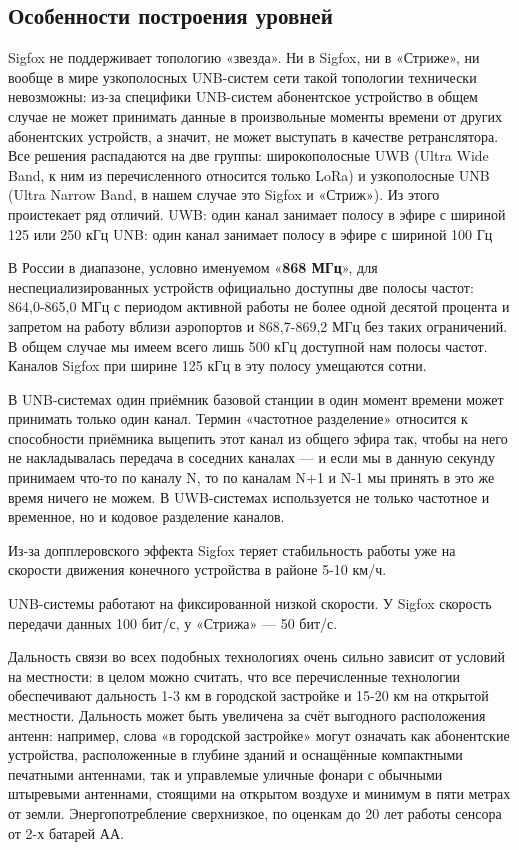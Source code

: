 \subsection{Особенности построения уровней}
Sigfox не поддерживает топологию «звезда». Ни в Sigfox, ни в «Стриже», ни вообще в мире узкополосных UNB-систем сети такой топологии технически невозможны: из-за специфики UNB-систем абонентское устройство в общем случае не может принимать данные в произвольные моменты времени от других абонентских устройств, а значит, не может выступать в качестве ретранслятора.
Все решения распадаются на две группы: широкополосные UWB (Ultra Wide Band, к ним из перечисленного относится только LoRa) и узкополосные UNB (Ultra Narrow Band, в нашем случае это Sigfox и «Стриж»). Из этого проистекает ряд отличий.
UWB: один канал занимает полосу в эфире с шириной 125 или 250 кГц
UNB: один канал занимает полосу в эфире с шириной 100 Гц

В России в диапазоне, условно именуемом «\textbf{868 МГц}», для
неспециализированных устройств официально доступны две полосы частот:
864,0-865,0 МГц с периодом активной работы не более одной десятой процента и
запретом на работу вблизи аэропортов и 868,7-869,2 МГц без таких ограничений. В общем случае мы имеем всего лишь 500 кГц доступной нам полосы частот. Каналов Sigfox при ширине 125 кГц в эту полосу умещаются сотни.

В UNB-системах один приёмник базовой станции в один момент времени может принимать только один канал.  Термин «частотное разделение» относится к способности приёмника выцепить этот канал из общего эфира так, чтобы на него не накладывалась передача в соседних каналах — и если мы в данную секунду принимаем что-то по каналу N, то по каналам N+1 и N-1 мы принять в это же время ничего не можем. В UWB-системах используется не только частотное и временное, но и кодовое разделение каналов.  

Из-за допплеровского эффекта Sigfox теряет стабильность работы уже на скорости движения конечного устройства в районе 5-10 км/ч. 

UNB-системы работают на фиксированной низкой скорости. У Sigfox скорость передачи данных 100 бит/с, у «Стрижа» — 50 бит/с.

Дальность связи во всех подобных технологиях очень сильно зависит от условий на местности: в целом можно считать, что все перечисленные технологии обеспечивают дальность 1-3 км в городской застройке и 15-20 км на открытой местности. Дальность может быть увеличена за счёт выгодного расположения антенн: например, слова «в городской застройке» могут означать как абонентские устройства, расположенные в глубине зданий и оснащённые компактными печатными антеннами, так и управлемые уличные фонари с обычными штыревыми антеннами, стоящими на открытом воздухе и минимум в пяти метрах от земли.
Энергопотребление сверхнизкое, по оценкам до 20 лет работы сенсора от 2-х батарей АА. 

\newpage